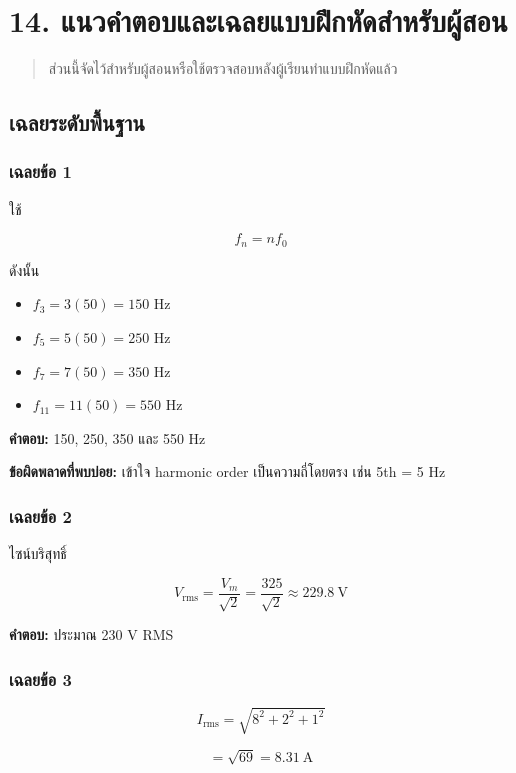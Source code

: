 \newpage

\section{14. แนวคำตอบและเฉลยแบบฝึกหัดสำหรับผู้สอน}

\begin{quote}
ส่วนนี้จัดไว้สำหรับผู้สอนหรือใช้ตรวจสอบหลังผู้เรียนทำแบบฝึกหัดแล้ว
\end{quote}

\subsection{เฉลยระดับพื้นฐาน}

\subsubsection{เฉลยข้อ 1}

ใช้

\[
f_n=nf_0
\]

ดังนั้น

\begin{itemize}
    \item $f_3=3(50)=150$ Hz
    \item $f_5=5(50)=250$ Hz
    \item $f_7=7(50)=350$ Hz
    \item $f_{11}=11(50)=550$ Hz
\end{itemize}

\textbf{คำตอบ:} 150, 250, 350 และ 550 Hz

\textbf{ข้อผิดพลาดที่พบบ่อย:} เข้าใจ harmonic order เป็นความถี่โดยตรง เช่น 5th = 5 Hz

\subsubsection{เฉลยข้อ 2}

ไซน์บริสุทธิ์

\[
V_{\mathrm{rms}}=\frac{V_m}{\sqrt{2}}=\frac{325}{\sqrt{2}}\approx229.8\ \text{V}
\]

\textbf{คำตอบ:} ประมาณ 230 V RMS

\subsubsection{เฉลยข้อ 3}

\[
I_{\mathrm{rms}}=\sqrt{8^2+2^2+1^2}
\]

\[
=\sqrt{69}=8.31\ \text{A}
\]

